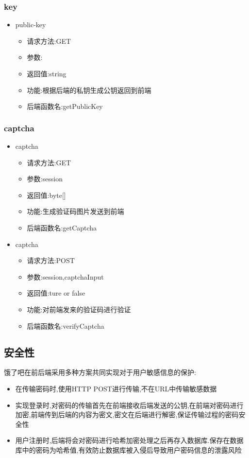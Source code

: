 \subsubsection*{key}
\begin{itemize}
  \item public-key
\begin{itemize}
    \item 请求方法:GET
    \item 参数:
    \item 返回值:string
    \item 功能:根据后端的私钥生成公钥返回到前端
    \item 后端函数名:getPublicKey
\end{itemize}
\end{itemize}

\subsubsection*{captcha}
\begin{itemize}
 \item captcha
\begin{itemize}
    \item 请求方法:GET
    \item 参数:session
    \item 返回值:byte[]
    \item 功能:生成验证码图片发送到前端
    \item 后端函数名:getCaptcha
\end{itemize}

 \item captcha

\begin{itemize}
    \item 请求方法:POST
    \item 参数:session,captchaInput
    \item 返回值:ture or false
    \item 功能:对前端发来的验证码进行验证
    \item 后端函数名:verifyCaptcha
\end{itemize}
\end{itemize}


\subsection{安全性}
饿了吧在前后端采用多种方案共同实现对于用户敏感信息的保护:
\begin{itemize}
    \item 在传输密码时,使用HTTP POST进行传输,不在URL中传输敏感数据
    \item 实现登录时,对密码的传输首先在前端接收后端发送的公钥,在前端对密码进行加密,前端传到后端的内容为密文,密文在后端进行解密,保证传输过程的密码安全性
    \item 用户注册时,后端将会对密码进行哈希加密处理之后再存入数据库.保存在数据库中的密码为哈希值,有效防止数据库被入侵后导致用户密码信息的泄露风险
\end{itemize}


